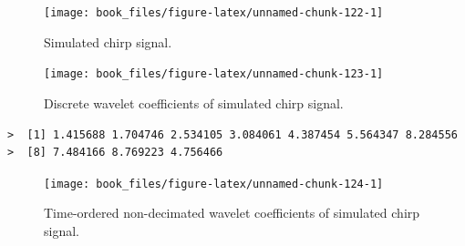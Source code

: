 \documentclass[b5paper,]{book}
\makeatletter
\newenvironment{Shaded}{\begin{snugshade}}{\end{snugshade}}
\newcommand{\KeywordTok}[1]{\textcolor[rgb]{0.13,0.29,0.53}{\textbf{{#1}}}}
\newcommand{\DataTypeTok}[1]{\textcolor[rgb]{0.13,0.29,0.53}{{#1}}}
\newcommand{\DecValTok}[1]{\textcolor[rgb]{0.00,0.00,0.81}{{#1}}}
\newcommand{\StringTok}[1]{\textcolor[rgb]{0.31,0.60,0.02}{{#1}}}
\newcommand{\NormalTok}[1]{{#1}}
\newenvironment{kframe}{%
\medskip{}
\setlength{\fboxsep}{.8em}
 \def\at@end@of@kframe{}%
 \ifinner\ifhmode%
  \def\at@end@of@kframe{\end{minipage}}%
  \begin{minipage}{\columnwidth}%
 \fi\fi%
 \def\FrameCommand##1{\hskip\@totalleftmargin \hskip-\fboxsep
 \colorbox{shadecolor}{##1}\hskip-\fboxsep
     \hskip-\linewidth \hskip-\@totalleftmargin \hskip\columnwidth}%
 \MakeFramed {\advance\hsize-\width
   \@totalleftmargin\z@ \linewidth\hsize
   \@setminipage}}%
 {\par\unskip\endMakeFramed%
 \at@end@of@kframe}
\renewenvironment{Shaded}{\begin{kframe}}{\end{kframe}}
\theoremstyle{definition}
\theoremstyle{definition}
\theoremstyle{definition}
\theoremstyle{remark}
\makeatother
\begin{document}
\begin{figure}

{\centering \texttt{[image: book\_files/figure-latex/unnamed-chunk-122-1]} 

}

\caption{Simulated chirp signal.}\label{fig:unnamed-chunk-122}
\end{figure}

\begin{Shaded}
\end{Shaded}

\begin{figure}

{\centering \texttt{[image: book\_files/figure-latex/unnamed-chunk-123-1]} 

}

\caption{Discrete wavelet coefficients of simulated chirp signal.}\label{fig:unnamed-chunk-123}
\end{figure}

\begin{verbatim}
>  [1] 1.415688 1.704746 2.534105 3.084061 4.387454 5.564347 8.284556
>  [8] 7.484166 8.769223 4.756466
\end{verbatim}

\begin{Shaded}
\end{Shaded}

\begin{figure}

{\centering \texttt{[image: book\_files/figure-latex/unnamed-chunk-124-1]} 

}

\caption{Time-ordered non-decimated wavelet coefficients of simulated chirp signal.}\label{fig:unnamed-chunk-124}
\end{figure}
\end{document}
